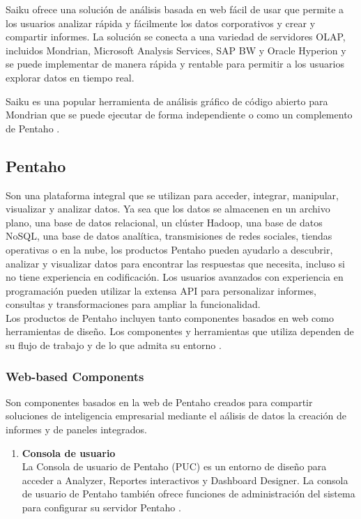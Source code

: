 \begin{spacing}{1.5}
	Saiku ofrece una solución de análisis basada en web fácil de usar que permite a los usuarios analizar rápida y fácilmente los datos corporativos y crear y compartir informes. La solución se conecta a una variedad de servidores OLAP, incluidos Mondrian, Microsoft Analysis Services, SAP BW y Oracle Hyperion y se puede implementar de manera rápida y rentable para permitir a los usuarios explorar datos en tiempo real.
	
	Saiku es una popular herramienta de análisis gráfico de código abierto para Mondrian que se puede ejecutar de forma independiente o como un complemento de Pentaho \cite{chap2_mondrian_action}.
	
	\subsection{Pentaho}
	Son una plataforma integral que se utilizan para acceder, integrar, manipular, visualizar y analizar datos. Ya sea que los datos se almacenen en un archivo plano, una base de datos relacional, un clúster Hadoop, una base de datos NoSQL, una base de datos analítica, transmisiones de redes sociales, tiendas operativas o en la nube, los productos Pentaho pueden ayudarlo a descubrir, analizar y visualizar datos para encontrar las respuestas que necesita, incluso si no tiene experiencia en codificación. Los usuarios avanzados con experiencia en programación pueden utilizar la extensa API para personalizar informes, consultas y transformaciones para ampliar la funcionalidad.\\
	Los productos de Pentaho incluyen tanto componentes basados en web como herramientas de diseño. Los componentes y herramientas que utiliza dependen de su flujo de trabajo y de lo que admita su entorno \cite{chap2_pentaho}.
	\subsubsection{Web-based Components}
	Son componentes basados en la web de Pentaho creados para compartir soluciones de inteligencia empresarial mediante el a\'{a}lisis de datos la creaci\'{o}n de informes y de paneles integrados.
		\begin{enumerate}[label=\alph*)]
			\item \textbf{Consola de usuario}\\
			La Consola de usuario de Pentaho (PUC) es un entorno de diseño para acceder a Analyzer, Reportes interactivos y Dashboard Designer. La consola de usuario de Pentaho también ofrece funciones de administración del sistema para configurar su servidor Pentaho \cite{chap2_pentaho}.
			

\end{enumerate}
\end{spacing}
